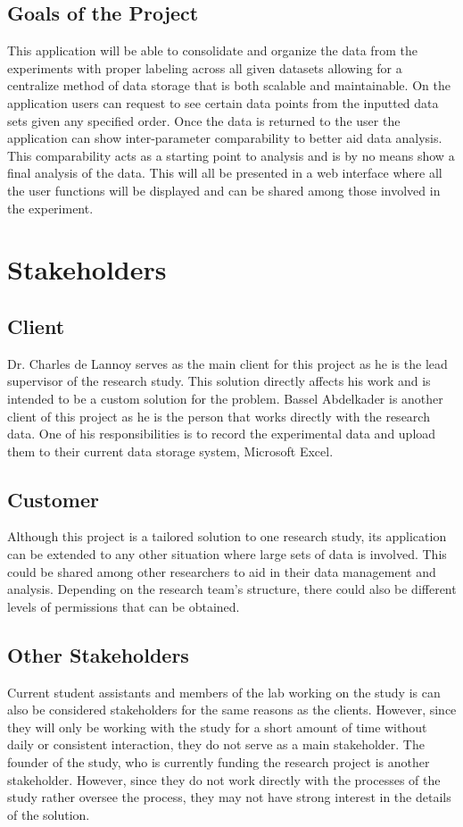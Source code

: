 \documentclass[12pt]{article}
\begin{document}
\subsection{Goals of the Project}
This application will be able to consolidate and organize the data from the
experiments with proper labeling across all given datasets allowing for a
centralize method of data storage that is both scalable and maintainable. On the
application users can request to see certain data points from the inputted data
sets given any specified order. Once the data is returned to the user the
application can show inter-parameter comparability to better aid data analysis.
This comparability acts as a starting point to analysis and is by no means show
a final analysis of the data. This will all be presented in a web interface
where all the user functions will be displayed and can be shared among those
involved in the experiment.   
\section{Stakeholders}

\subsection{Client}
Dr. Charles de Lannoy serves as the main client for this project as he is the
lead supervisor of the research study. This solution directly affects his work and
is intended to be a custom solution for the problem. Bassel Abdelkader is
another client of this project as he is the person that works directly with the
research data. One of his responsibilities is to record the experimental data and
upload them to their current data storage system, Microsoft Excel. 
\subsection{Customer}
Although this project is a tailored solution to one research study, its
application can be extended to any other situation where large sets of data is
involved. This could be shared among other researchers to aid in their data
management and analysis. Depending on the research team's structure, there could
also be different levels of permissions that can be obtained.
\subsection{Other Stakeholders}
Current student assistants and members of the lab working on the study is can also be
considered stakeholders for the same reasons as the clients. However, since they
will only be working with the study for a short amount of time without daily or
consistent interaction, they do not serve as a main stakeholder. The founder of
the study, who is currently funding the research project is another stakeholder.
However, since they do not work directly with the processes of the study rather
oversee the process, they may not have strong interest in the details of the solution. 
\end{document}
